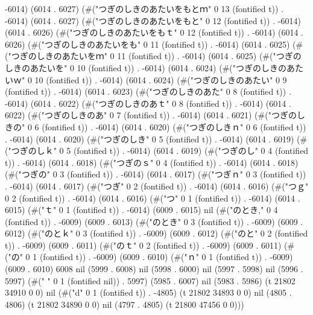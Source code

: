 -6014) (6014 . 6027) (#("つぎのしきのあたいをもとｍ" 0 13 (fontified t)) . -6014) (6014 . 6027) (#("つぎのしきのあたいをもと" 0 12 (fontified t)) . -6014) (6014 . 6026) (#("つぎのしきのあたいをもｔ" 0 12 (fontified t)) . -6014) (6014 . 6026) (#("つぎのしきのあたいをも" 0 11 (fontified t)) . -6014) (6014 . 6025) (#("つぎのしきのあたいをｍ" 0 11 (fontified t)) . -6014) (6014 . 6025) (#("つぎのしきのあたいを" 0 10 (fontified t)) . -6014) (6014 . 6024) (#("つぎのしきのあたいｗ" 0 10 (fontified t)) . -6014) (6014 . 6024) (#("つぎのしきのあたい" 0 9 (fontified t)) . -6014) (6014 . 6023) (#("つぎのしきのあた" 0 8 (fontified t)) . -6014) (6014 . 6022) (#("つぎのしきのあｔ" 0 8 (fontified t)) . -6014) (6014 . 6022) (#("つぎのしきのあ" 0 7 (fontified t)) . -6014) (6014 . 6021) (#("つぎのしきの" 0 6 (fontified t)) . -6014) (6014 . 6020) (#("つぎのしきｎ" 0 6 (fontified t)) . -6014) (6014 . 6020) (#("つぎのしき" 0 5 (fontified t)) . -6014) (6014 . 6019) (#("つぎのしｋ" 0 5 (fontified t)) . -6014) (6014 . 6019) (#("つぎのし" 0 4 (fontified t)) . -6014) (6014 . 6018) (#("つぎのｓ" 0 4 (fontified t)) . -6014) (6014 . 6018) (#("つぎの" 0 3 (fontified t)) . -6014) (6014 . 6017) (#("つぎｎ" 0 3 (fontified t)) . -6014) (6014 . 6017) (#("つぎ" 0 2 (fontified t)) . -6014) (6014 . 6016) (#("つｇ" 0 2 (fontified t)) . -6014) (6014 . 6016) (#("つ" 0 1 (fontified t)) . -6014) (6014 . 6015) (#("ｔ" 0 1 (fontified t)) . -6014) (6009 . 6015) nil (#("のとき," 0 4 (fontified t)) . -6009) (6009 . 6013) (#("のとき" 0 3 (fontified t)) . -6009) (6009 . 6012) (#("のとｋ" 0 3 (fontified t)) . -6009) (6009 . 6012) (#("のと" 0 2 (fontified t)) . -6009) (6009 . 6011) (#("のｔ" 0 2 (fontified t)) . -6009) (6009 . 6011) (#("の" 0 1 (fontified t)) . -6009) (6009 . 6010) (#("ｎ" 0 1 (fontified t)) . -6009) (6009 . 6010) 6008 nil (5999 . 6008) nil (5998 . 6000) nil (5997 . 5998) nil (5996 . 5997) (#(" " 0 1 (fontified nil)) . 5997) (5985 . 6007) nil (5983 . 5986) (t 21802 34910 0 0) nil (#("d" 0 1 (fontified t)) . -4805) (t 21802 34893 0 0) nil (4805 . 4806) (t 21802 34890 0 0) nil (4797 . 4805) (t 21800 47456 0 0)))
